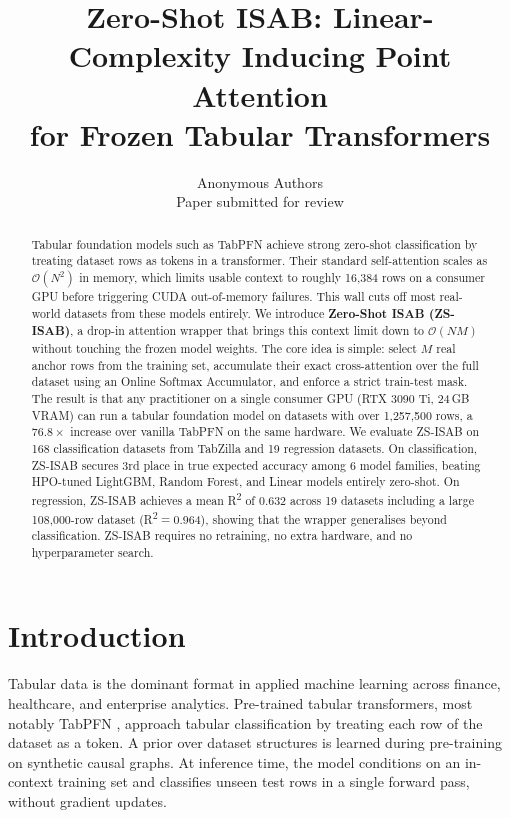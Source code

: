 \documentclass[10pt]{article}
\title{Zero-Shot ISAB: Linear-Complexity Inducing Point Attention\\for Frozen Tabular Transformers}
\author{\name Anonymous Authors \\
      \addr Paper submitted for review}
\begin{document}
\maketitle

\begin{abstract}
Tabular foundation models such as TabPFN achieve strong zero-shot classification by treating dataset rows as tokens in a transformer. Their standard self-attention scales as $\mathcal{O}(N^2)$ in memory, which limits usable context to roughly 16{,}384 rows on a consumer GPU before triggering CUDA out-of-memory failures. This wall cuts off most real-world datasets from these models entirely. We introduce \textbf{Zero-Shot ISAB (ZS-ISAB)}, a drop-in attention wrapper that brings this context limit down to $\mathcal{O}(NM)$ without touching the frozen model weights. The core idea is simple: select $M$ real anchor rows from the training set, accumulate their exact cross-attention over the full dataset using an Online Softmax Accumulator, and enforce a strict train-test mask. The result is that any practitioner on a single consumer GPU (RTX 3090 Ti, 24\,GB VRAM) can run a tabular foundation model on datasets with over 1{,}257{,}500 rows, a $76.8\times$ increase over vanilla TabPFN on the same hardware. We evaluate ZS-ISAB on 168 classification datasets from TabZilla and 19 regression datasets. On classification, ZS-ISAB secures 3rd place in true expected accuracy among 6 model families, beating HPO-tuned LightGBM, Random Forest, and Linear models entirely zero-shot. On regression, ZS-ISAB achieves a mean R\textsuperscript{2} of 0.632 across 19 datasets including a large 108{,}000-row dataset (R\textsuperscript{2}$=$0.964), showing that the wrapper generalises beyond classification. ZS-ISAB requires no retraining, no extra hardware, and no hyperparameter search.
\end{abstract}

\section{Introduction}

Tabular data is the dominant format in applied machine learning across finance, healthcare, and enterprise analytics. Pre-trained tabular transformers, most notably TabPFN \citep{hollmann2022tabpfn}, approach tabular classification by treating each row of the dataset as a token. A prior over dataset structures is learned during pre-training on synthetic causal graphs. At inference time, the model conditions on an in-context training set and classifies unseen test rows in a single forward pass, without gradient updates.
\end{document}

